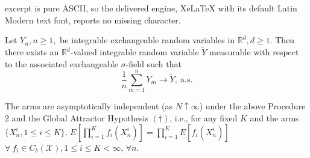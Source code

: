 \documentclass[10pt,a4paper]{amsart}
\newcommand{\X}{\mathcal{X}}
\begin{document}
excerpt is pure ASCII, so the delivered engine, XeLaTeX with its default Latin Modern text font, reports no missing character.
\begin{corollary}\label{SLLNX} Let $Y_n, n \geq 1,$ be integrable exchangeable random variables in $\mathbb{R}^d, d \geq 1$.  Then there exists an $\mathbb{R}^d$-valued integrable random variable $\widetilde{Y}$ measurable with respect to the associated exchangeable $\sigma$-field such that
$$\frac{1}{n}\sum_{m=1}^nY_m \to \widetilde{Y}, \ \mbox{a.s.}$$
\end{corollary}

\begin{theorem}\label{indep} The arms are asymptotically independent (as $N\uparrow\infty$) under the above Procedure 2 and the Global Attractor Hypothesis \textbf{$(\dagger)$}, i.e., for any fixed $K$ and the arms $\{X^i_n, 1 \leq i \leq K \}$, $E\left[\prod_{i=1}^Kf_i(X^i_n)\right] = \prod_{i=1}^KE\left[f_i(X^i_n)\right]$ \ $\forall \ f_i\in C_b(\X), 1 \leq i \leq K < \infty$, $\forall n$.
\end{theorem}
\end{document}
